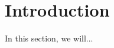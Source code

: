 \section{Introduction}
In this section, we will...\cite{mohri2012foundations,zhu2003eliminating,freund1997decision,dietterich2000experimental,cortes2014deep}